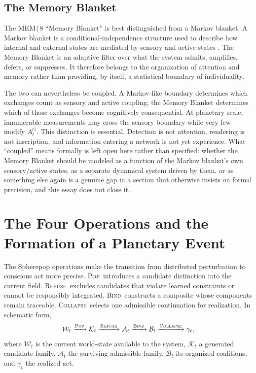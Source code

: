 \documentclass[11pt]{article}
\newcommand{\Pop}{\textsc{Pop}}
\newcommand{\Refuse}{\textsc{Refuse}}
\newcommand{\Bind}{\textsc{Bind}}
\newcommand{\Collapse}{\textsc{Collapse}}
\begin{document}
\subsection{The Memory Blanket}
\label{sec:memory-blanket}

The MEM\,$|$\,8 ``Memory Blanket'' is best distinguished from a Markov blanket. A Markov blanket is a conditional-independence structure used to describe how internal and external states are mediated by sensory and active states \cite{kirchhoff2018}. The Memory Blanket is an adaptive filter over what the system admits, amplifies, defers, or suppresses. It therefore belongs to the organization of attention and memory rather than providing, by itself, a statistical boundary of individuality.

The two can nevertheless be coupled. A Markov-like boundary determines which exchanges count as sensory and active coupling; the Memory Blanket determines which of those exchanges become cognitively consequential. At planetary scale, innumerable measurements may cross the sensory boundary while very few modify $A_t^G$. This distinction is essential. Detection is not attention, rendering is not inscription, and information entering a network is not yet experience. What ``coupled'' means formally is left open here rather than specified: whether the Memory Blanket should be modeled as a function of the Markov blanket's own sensory/active states, as a separate dynamical system driven by them, or as something else again is a genuine gap in a section that otherwise insists on formal precision, and this essay does not close it.

\section{The Four Operations and the Formation of a Planetary Event}
\label{sec:four-operations}

The Spherepop operations make the transition from distributed perturbation to conscious act more precise. \Pop\ introduces a candidate distinction into the current field. \Refuse\ excludes candidates that violate learned constraints or cannot be responsibly integrated. \Bind\ constructs a composite whose components remain traceable. \Collapse\ selects one admissible continuation for realization. In schematic form,
\[
\mathcal{W}_t
\xrightarrow{\Pop}
\mathcal{K}_t
\xrightarrow{\Refuse}
\mathcal{A}_t
\xrightarrow{\Bind}
\mathcal{B}_t
\xrightarrow{\Collapse}
\gamma_t,
\]
where $\mathcal{W}_t$ is the current world-state available to the system, $\mathcal{K}_t$ a generated candidate family, $\mathcal{A}_t$ the surviving admissible family, $\mathcal{B}_t$ its organized coalitions, and $\gamma_t$ the realized act.
\end{document}
